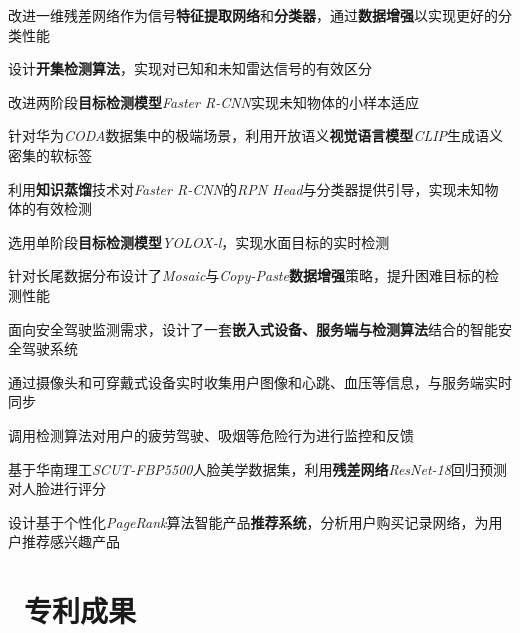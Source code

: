 \documentclass{resume}
\begin{document}
\faAngleRight 改进一维残差网络作为信号\textbf{特征提取网络}和\textbf{分类器}，通过\textbf{数据增强}以实现更好的分类性能

\faAngleRight 设计\textbf{开集检测算法}，实现对已知和未知雷达信号的有效区分

\vspace{5pt}
\faAngleRight 改进两阶段\textbf{目标检测模型}\textit{Faster R-CNN}实现未知物体的小样本适应

\faAngleRight 针对华为\textit{CODA}数据集中的极端场景，利用开放语义\textbf{视觉语言模型}\textit{CLIP}生成语义密集的软标签

\faAngleRight 利用\textbf{知识蒸馏}技术对\textit{Faster R-CNN}的\textit{RPN Head}与分类器提供引导，实现未知物体的有效检测

\vspace{5pt}
\faAngleRight 选用单阶段\textbf{目标检测模型}\textit{YOLOX-l}，实现水面目标的实时检测

\faAngleRight 针对长尾数据分布设计了\textit{Mosaic}与\textit{Copy-Paste}\textbf{数据增强}策略，提升困难目标的检测性能

\vspace{5pt}
\faAngleRight 面向安全驾驶监测需求，设计了一套\textbf{嵌入式设备、服务端与检测算法}结合的智能安全驾驶系统

\faAngleRight 通过摄像头和可穿戴式设备实时收集用户图像和心跳、血压等信息，与服务端实时同步

\faAngleRight 调用检测算法对用户的疲劳驾驶、吸烟等危险行为进行监控和反馈

\vspace{5pt}
\faAngleRight 基于华南理工\textit{SCUT-FBP5500}人脸美学数据集，利用\textbf{残差网络}\textit{ResNet-18}回归预测对人脸进行评分

\faAngleRight 设计基于个性化\textit{PageRank}算法智能产品\textbf{推荐系统}，分析用户购买记录网络，为用户推荐感兴趣产品

\section{\faCogs\ 专利成果}

\end{document}
